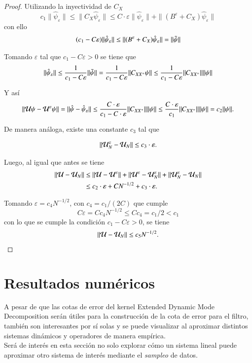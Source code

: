 \begin{proof}
    Utilizando la inyectividad de $C_X$
    \[
    c_1 \|\hat{\psi}_\varepsilon\| \leq \| C_X \hat{\psi}_\varepsilon \| \leq  C \cdot \varepsilon  \| \hat{\psi}_\varepsilon \| + \| (B^\varepsilon + C_X)\hat{\psi}_\varepsilon\|
    \]
    con ello
    \[
    (c_1 - C\varepsilon)  \|\hat{\psi}_\varepsilon\| \leq \| (B^\varepsilon + C_X)\hat{\psi}_\varepsilon\| = \| \Tilde{\psi} \|
    \]
    
    Tomando $\varepsilon$ tal que $c_1 - C \varepsilon > 0$ se tiene que
    \[
    \|\hat{\psi}_\varepsilon\| \leq \frac{1}{c_1 - C\varepsilon} \| \Tilde{\psi} \| = \frac{1}{c_1 - C\varepsilon} \| C_{XX^+} \psi \| \leq \frac{1}{c_1 - C\varepsilon} \| C_{XX^+} \| \| \psi \|
    \]

     Y así
    \[
     \| \mathcal{U}\psi - \mathcal{U}^\varepsilon\psi \| = \| \hat{\psi} - \hat{\psi}_\varepsilon \| \leq \frac{C \cdot \varepsilon}{c_1 - C \cdot \varepsilon} \| C_{XX^+} \| \| \psi \| \leq \frac{C \cdot \varepsilon}{c_1} \| C_{XX^+} \| \| \psi \| = c_2 \| \psi \|.
    \]

    De manera análoga, existe una constante $c_3$ tal que 

    \[
    \| \mathcal{U}^\varepsilon_N - \mathcal{U}_N \| \leq c_3 \cdot \varepsilon.
    \]
    
    Luego, al igual que antes se tiene
    \[
    \begin{aligned}
        \| \mathcal{U} - \mathcal{U}_N \| & \leq \| \mathcal{U} - \mathcal{U}^\varepsilon \| + \| \mathcal{U}^\varepsilon - \mathcal{U}_N^\varepsilon \| + \| \mathcal{U}_N^\varepsilon - \mathcal{U}_N \| \\
        & \leq c_2 \cdot \varepsilon + C N^{-1/2} + c_3 \cdot \varepsilon.
    \end{aligned}
    \]

   Tomando $\varepsilon = c_4 N^{-1/2}$, con $c_4 = c_1/(2C)$ que cumple
   \[
   C  \varepsilon = C c_4 N^{-1/2} \leq C c_4 = c_1/2 < c_1
   \]
   con lo que se cumple la condición $c_1 - C  \varepsilon > 0$, se tiene
   \[
   \| \mathcal{U} - \mathcal{U}_N \| \leq c_5 N^{-1/2}.
   \]
\end{proof}

\section{Resultados numéricos}

A pesar de que las cotas de error del kernel Extended Dynamic Mode Decomposition serán útiles para la construcción de la cota de error para el filtro, también son interesantes por sí solas y se puede visualizar al aproximar distintos sistemas dinámicos y operadores de manera empírica.\\
Será de interés en esta sección no solo explorar cómo un sistema lineal puede aproximar otro sistema de interés mediante el \textit{sampleo} de datos.

